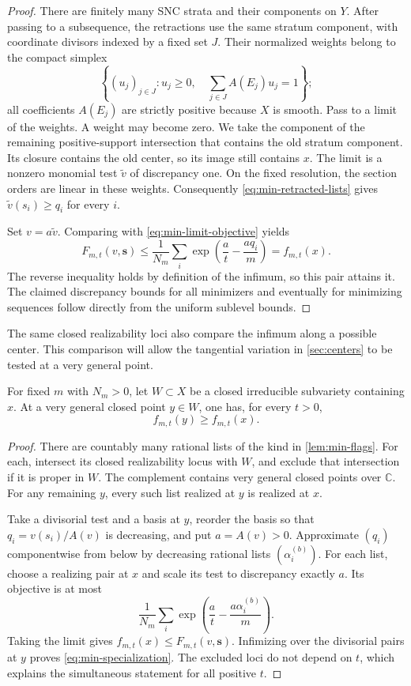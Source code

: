 \begin{proof}
There are finitely many SNC strata and their components on $Y$. After passing to a subsequence, the retractions use the same stratum component, with coordinate divisors indexed by a fixed set $J$. Their normalized weights belong to the compact simplex
\[
 \left\{(u_j)_{j\in J}:u_j\geq0,\quad
                \sum_{j\in J}{A}(E_j)u_j=1\right\};
\]
all coefficients ${A}(E_j)$ are strictly positive because $X$ is smooth. Pass to a limit of the weights. A weight may become zero. We take the component of the remaining positive-support intersection that contains the old stratum component. Its closure contains the old center, so its image still contains $x$. The limit is a nonzero monomial test $\widetilde v$ of discrepancy one. On the fixed resolution, the section orders are linear in these weights. Consequently \eqref{eq:min-retracted-lists} gives $\widetilde v(s_i)\geq q_i$ for every $i$.

Set $v=a\widetilde v$. Comparing with \eqref{eq:min-limit-objective} yields
\[
 F_{m,t}(v,\mathbf{s})
 \leq\frac1{N_m}\sum_i
       \exp\!\left(\frac at-\frac{aq_i}m\right)
 =f_{m,t}(x).
\]
The reverse inequality holds by definition of the infimum, so this pair attains it. The claimed discrepancy bounds for all minimizers and eventually for minimizing sequences follow directly from the uniform sublevel bounds.
\end{proof}

The same closed realizability loci also compare the infimum along a possible center. This comparison will allow the tangential variation in \cref{sec:centers} to be tested at a very general point.

\begin{lemma}
\label{lem:specialization}
For fixed $m$ with $N_m>0$, let $W\subset X$ be a closed irreducible subvariety containing $x$. At a very general closed point $y\in W$, one has, for every $t>0$,
\begin{equation}
\label{eq:min-specialization}
 f_{m,t}(y)\geq f_{m,t}(x).
\end{equation}
\end{lemma}

\begin{proof}
There are countably many rational lists of the kind in \cref{lem:min-flags}. For each, intersect its closed realizability locus with $W$, and exclude that intersection if it is proper in $W$. The complement contains very general closed points over $\mathbb{C}$. For any remaining $y$, every such list realized at $y$ is realized at $x$.

Take a divisorial test and a basis at $y$, reorder the basis so that $q_i=v(s_i)/{A}(v)$ is decreasing, and put $a={A}(v)>0$. Approximate $(q_i)$ componentwise from below by decreasing rational lists $(\alpha_i^{(b)})$. For each list, choose a realizing pair at $x$ and scale its test to discrepancy exactly $a$. Its objective is at most
\[
 \frac1{N_m}\sum_i
       \exp\!\left(\frac at-\frac{a\alpha_i^{(b)}}m\right).
\]
Taking the limit gives $f_{m,t}(x)\leq F_{m,t}(v,\mathbf{s})$. Infimizing over the divisorial pairs at $y$ proves \eqref{eq:min-specialization}. The excluded loci do not depend on $t$, which explains the simultaneous statement for all positive $t$.
\end{proof}

